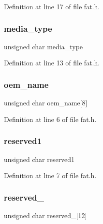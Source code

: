 Definition at line 17 of file fat.\+h.

\mbox{\label{a00152_ab90dc4a72adfaa3c57712df0dab86154_ab90dc4a72adfaa3c57712df0dab86154}} 
\subsubsection{\texorpdfstring{media\+\_\+type}{media\_type}}
{\footnotesize\ttfamily unsigned char media\+\_\+type}



Definition at line 13 of file fat.\+h.

\mbox{\label{a00152_aad08c3f8e8a444d492cc77be16a79d86_aad08c3f8e8a444d492cc77be16a79d86}} 
\subsubsection{\texorpdfstring{oem\+\_\+name}{oem\_name}}
{\footnotesize\ttfamily unsigned char oem\+\_\+name\mbox{[}8\mbox{]}}



Definition at line 6 of file fat.\+h.

\mbox{\label{a00152_affe215a7220b2d52fb9dacf3b35e56dc_affe215a7220b2d52fb9dacf3b35e56dc}} 
\subsubsection{\texorpdfstring{reserved1}{reserved1}}
{\footnotesize\ttfamily unsigned char reserved1}



Definition at line 7 of file fat.\+h.

\mbox{\label{a00152_a9be1862088e39957378b98c43222fc0d_a9be1862088e39957378b98c43222fc0d}} 
\subsubsection{\texorpdfstring{reserved\+\_}{reserved\_0}}
{\footnotesize\ttfamily unsigned char reserved\+\_\mbox{[}12\mbox{]}}



